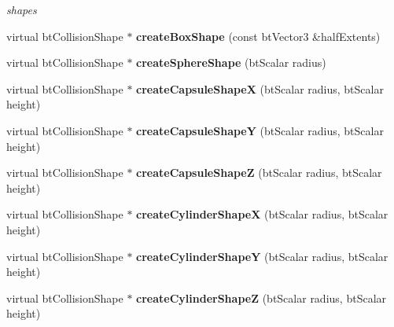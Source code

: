 \begin{DoxyCompactItemize}
\begin{DoxyCompactList}\small\item\em shapes \end{DoxyCompactList}\item 
\hypertarget{classbt_world_importer_a5d4ec053e841b139cb5321b2a7755c6c}{virtual bt\+Collision\+Shape $\ast$ {\bfseries create\+Box\+Shape} (const bt\+Vector3 \&half\+Extents)}\label{classbt_world_importer_a5d4ec053e841b139cb5321b2a7755c6c}

\item 
\hypertarget{classbt_world_importer_ab95da520b8d416df52ca0dce43d9aa2d}{virtual bt\+Collision\+Shape $\ast$ {\bfseries create\+Sphere\+Shape} (bt\+Scalar radius)}\label{classbt_world_importer_ab95da520b8d416df52ca0dce43d9aa2d}

\item 
\hypertarget{classbt_world_importer_a28f12cc4febac516821654954db2dd9c}{virtual bt\+Collision\+Shape $\ast$ {\bfseries create\+Capsule\+Shape\+X} (bt\+Scalar radius, bt\+Scalar height)}\label{classbt_world_importer_a28f12cc4febac516821654954db2dd9c}

\item 
\hypertarget{classbt_world_importer_a0b393e26aedd6a01a43ab70b7e720d30}{virtual bt\+Collision\+Shape $\ast$ {\bfseries create\+Capsule\+Shape\+Y} (bt\+Scalar radius, bt\+Scalar height)}\label{classbt_world_importer_a0b393e26aedd6a01a43ab70b7e720d30}

\item 
\hypertarget{classbt_world_importer_aee5f30e3b12e515b48af9e41025134f3}{virtual bt\+Collision\+Shape $\ast$ {\bfseries create\+Capsule\+Shape\+Z} (bt\+Scalar radius, bt\+Scalar height)}\label{classbt_world_importer_aee5f30e3b12e515b48af9e41025134f3}

\item 
\hypertarget{classbt_world_importer_a83eb42068dc22f2d9ed788f05e3a4f93}{virtual bt\+Collision\+Shape $\ast$ {\bfseries create\+Cylinder\+Shape\+X} (bt\+Scalar radius, bt\+Scalar height)}\label{classbt_world_importer_a83eb42068dc22f2d9ed788f05e3a4f93}

\item 
\hypertarget{classbt_world_importer_a771437c0979e58c97564a73a8cbcb59e}{virtual bt\+Collision\+Shape $\ast$ {\bfseries create\+Cylinder\+Shape\+Y} (bt\+Scalar radius, bt\+Scalar height)}\label{classbt_world_importer_a771437c0979e58c97564a73a8cbcb59e}

\item 
\hypertarget{classbt_world_importer_ae8b8238b609ecfae71d06ef2e6730c66}{virtual bt\+Collision\+Shape $\ast$ {\bfseries create\+Cylinder\+Shape\+Z} (bt\+Scalar radius, bt\+Scalar height)}\label{classbt_world_importer_ae8b8238b609ecfae71d06ef2e6730c66}


\end{DoxyCompactItemize}
